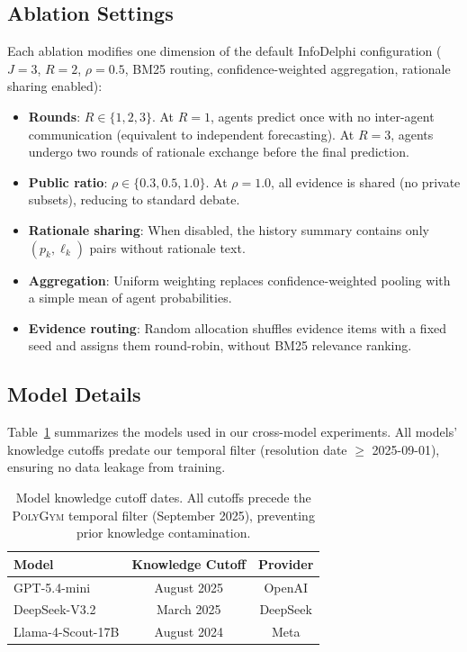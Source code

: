 \documentclass[11pt]{article}
\theoremstyle{plain}
\theoremstyle{definition}
\begin{document}
\subsection{Ablation Settings}

Each ablation modifies one dimension of the default InfoDelphi configuration ($J{=}3$, $R{=}2$, $\rho{=}0.5$, BM25 routing, confidence-weighted aggregation, rationale sharing enabled):

\begin{itemize}[nosep]
  \item \textbf{Rounds}: $R \in \{1, 2, 3\}$. At $R{=}1$, agents predict once with no inter-agent communication (equivalent to independent forecasting). At $R{=}3$, agents undergo two rounds of rationale exchange before the final prediction.
  \item \textbf{Public ratio}: $\rho \in \{0.3, 0.5, 1.0\}$. At $\rho{=}1.0$, all evidence is shared (no private subsets), reducing to standard debate.
  \item \textbf{Rationale sharing}: When disabled, the history summary contains only $(p_k, \ell_k)$ pairs without rationale text.
  \item \textbf{Aggregation}: Uniform weighting replaces confidence-weighted pooling with a simple mean of agent probabilities.
  \item \textbf{Evidence routing}: Random allocation shuffles evidence items with a fixed seed and assigns them round-robin, without BM25 relevance ranking.
\end{itemize}

\subsection{Model Details}
\label{model_details}

Table~\ref{tab:model_details} summarizes the models used in our cross-model experiments. All models' knowledge cutoffs predate our temporal filter (resolution date $\geq$ 2025-09-01), ensuring no data leakage from training.

\begin{table}[h]
\centering
\small
\begin{tabular}{lcc}
\toprule
\textbf{Model} & \textbf{Knowledge Cutoff} & \textbf{Provider} \\
\midrule
GPT-5.4-mini & August 2025 & OpenAI \\
DeepSeek-V3.2 & March 2025 & DeepSeek \\
Llama-4-Scout-17B & August 2024 & Meta \\
\bottomrule
\end{tabular}
\caption{Model knowledge cutoff dates. All cutoffs precede the \textsc{PolyGym} temporal filter (September 2025), preventing prior knowledge contamination.}
\label{tab:model_details}
\end{table}
\end{document}
